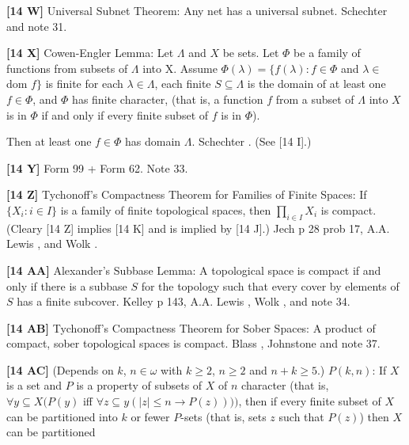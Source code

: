 \smallskip
\item{}{\bf [14 W]}  Universal Subnet Theorem:  Any net has a universal
subnet.  \ac{Schechter} \cite{1996a} and note 31.
\smallskip
\item{}{\bf [14 X]}  Cowen-Engler Lemma:  Let $\Lambda$ and $X$ be sets.
Let $\Phi$ be a family of functions from subsets of $\Lambda$ into X.
Assume
 $\Phi(\lambda) = \{f(\lambda ): f\in\Phi$ and $\lambda\in$
dom $f\}$ is finite for each $\lambda\in \Lambda$,
 each finite $S\subseteq\Lambda$ is the domain of at
least one $f\in\Phi$,  and
 $\Phi$ has finite character, (that is, a function $f$ from
a subset of $\Lambda$ into $X$ is in $\Phi$ if and only if every finite
subset of $f$ is in $\Phi$).
\item{}Then at least one $f\in\Phi$ has domain $\Lambda$. \ac{Schechter}
\cite{1996a}. (See [14 I].) 
\smallskip
\item{}{\bf [14 Y]}  Form 99  + Form 62. Note 33.
\smallskip
\item{}{\bf [14 Z]} Tychonoff's Compactness Theorem for Families of Finite
Spaces: If $\{ X_i:i\in I\}$ is a family of finite topological spaces, then
$\prod_{i\in I}X_i$ is compact.  (Cleary [14 Z] implies [14 K] and is
implied by [14 J].)  \ac{Jech} \cite{1973b} p 28 prob 17,
A.A. \ac{Lewis} \cite{1983}, and \ac{Wolk} \cite{1967}.
\smallskip
\item{}{\bf [14 AA]}  Alexander's Subbase Lemma: A topological space is
compact if and only if there is a subbase $S$ for  the  topology
such that every cover by elements of $S$ has a finite  subcover.
\ac{Kelley} \cite{1955} p 143, A.A. \ac{Lewis} \cite{1983}, \ac{Wolk}
\cite{1967}, and note 34. 
\smallskip
\item{}{\bf [14 AB]} Tychonoff's Compactness Theorem for Sober Spaces: A
product of compact, sober topological spaces is compact.
\ac{Blass} \cite{1986}, \ac{Johnstone} \cite{1984} and note 37.
\smallskip
\item{}{\bf [14 AC]} (Depends on $k$, $n\in\omega$ with $k\ge 2$, $n\ge 2$
and $n + k\ge 5$.) $P(k,n)$: If $X$ is a set and $P$ is a property of
subsets of $X$ of $n$ character (that is, $\forall y\subseteq X (P(y)$
iff $\forall z\subseteq y (|z|\le n\rightarrow P(z))))$, then if every
finite subset of $X$ can be  partitioned into $k$ or fewer $P$-sets
(that is, sets $z$ such that $P(z)$) then $X$ can be partitioned
